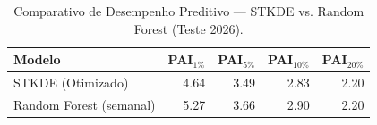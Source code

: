 \begin{table}[htb]
\centering
\caption{Comparativo de Desempenho Preditivo — STKDE vs. Random Forest (Teste 2026).}
\label{tab:comparativo_modelos}
\small
\begin{tabular}{lrrrr}
\toprule
Modelo & PAI$_{1\%}$ & PAI$_{5\%}$ & PAI$_{10\%}$ & PAI$_{20\%}$ \\
\midrule
STKDE (Otimizado) & 4.64 & 3.49 & 2.83 & 2.20 \\
Random Forest (semanal) & 5.27 & 3.66 & 2.90 & 2.20 \\
\bottomrule
\end{tabular}
\end{table}
